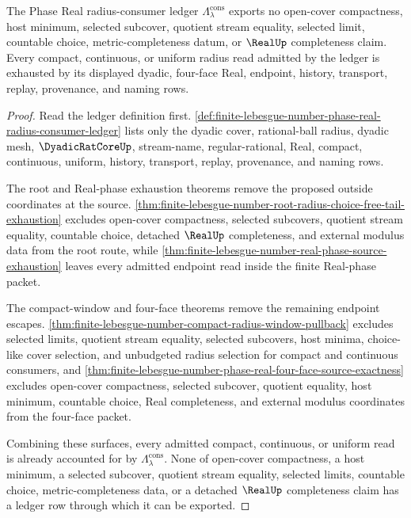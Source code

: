 \begin{theorem}
\label{thm:finite-lebesgue-number-phase-real-radius-consumer-exhaustion}
The Phase Real radius-consumer ledger $\Lambda_{\lambda}^{\mathrm{cons}}$ exports no open-cover compactness, host minimum, selected subcover, quotient stream equality, selected limit, countable choice, metric-completeness datum, or $\RealUp$ completeness claim. Every compact, continuous, or uniform radius read admitted by the ledger is exhausted by its displayed dyadic, four-face Real, endpoint, history, transport, replay, provenance, and naming rows.
\end{theorem}
\begin{proof}
Read the ledger definition first. \autoref{def:finite-lebesgue-number-phase-real-radius-consumer-ledger} lists only the dyadic cover, rational-ball radius, dyadic mesh, $\DyadicRatCoreUp$, stream-name, regular-rational, Real, compact, continuous, uniform, history, transport, replay, provenance, and naming rows.

The root and Real-phase exhaustion theorems remove the proposed outside coordinates at the source. \autoref{thm:finite-lebesgue-number-root-radius-choice-free-tail-exhaustion} excludes open-cover compactness, selected subcovers, quotient stream equality, countable choice, detached $\RealUp$ completeness, and external modulus data from the root route, while \autoref{thm:finite-lebesgue-number-real-phase-source-exhaustion} leaves every admitted endpoint read inside the finite Real-phase packet.

The compact-window and four-face theorems remove the remaining endpoint escapes. \autoref{thm:finite-lebesgue-number-compact-radius-window-pullback} excludes selected limits, quotient stream equality, selected subcovers, host minima, choice-like cover selection, and unbudgeted radius selection for compact and continuous consumers, and \autoref{thm:finite-lebesgue-number-phase-real-four-face-source-exactness} excludes open-cover compactness, selected subcover, quotient equality, host minimum, countable choice, Real completeness, and external modulus coordinates from the four-face packet.

Combining these surfaces, every admitted compact, continuous, or uniform read is already accounted for by $\Lambda_{\lambda}^{\mathrm{cons}}$. None of open-cover compactness, a host minimum, a selected subcover, quotient stream equality, selected limits, countable choice, metric-completeness data, or a detached $\RealUp$ completeness claim has a ledger row through which it can be exported.
\end{proof}
